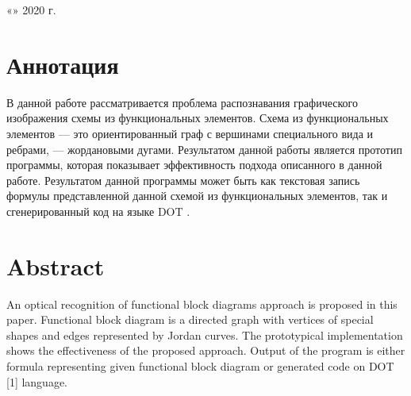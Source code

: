 \documentclass[makeidx, a4paper, 14pt]{extarticle}
\begin{document}
\begin{titlepage}
\begin{center}
\begin{small}
            \smallskip

            \begin{flushright}
              «\underline{\hspace{1cm}}» \underline{\hspace{3.5cm}} 2020 г.
            \end{flushright}
        \end{small}

    \end{center}
\end{titlepage}

\newpage

\section*{Аннотация}
В данной работе рассматривается проблема распознавания графического изображения схемы из функциональных элементов. Схема из функциональных элементов --- это
ориентированный граф с вершинами специального вида и ребрами, --- жордановыми дугами. Результатом данной работы является прототип программы,
которая показывает эффективность подхода описанного в данной работе. Результатом данной программы может быть как текстовая запись формулы
представленной данной схемой из функциональных элементов, так и сгенерированный код на языке DOT \cite{dot_lang}. \\

\section*{Abstract}
\begin{otherlanguage}{english}
    \noindent An optical recognition of functional block diagrams approach is proposed in this paper.
    Functional block diagram is a directed graph with vertices of special shapes and edges represented by Jordan curves.
    The prototypical implementation shows the effectiveness of the proposed approach. Output of the program is
    either formula representing given functional block diagram or generated code on DOT [1] language.
\end{otherlanguage}

\tableofcontents
\end{document}
